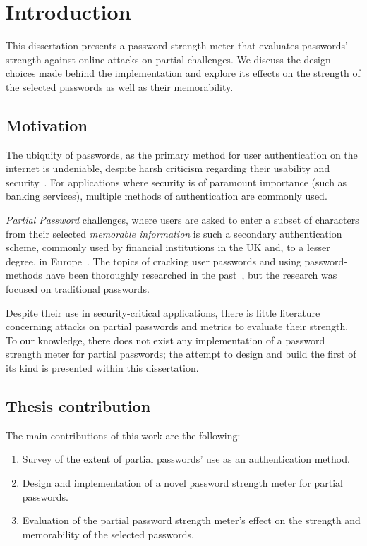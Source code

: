 
\chapter{Introduction}
  \label{cha:intro}
  This dissertation presents a password strength meter that evaluates passwords' strength against online attacks on partial challenges. We discuss the design choices made behind the implementation and explore its effects on the strength of the selected passwords as well as their memorability.

  \section{Motivation}
    \label{sec:motivation}
    The ubiquity of passwords, as the primary method for user authentication on the internet is undeniable, despite harsh criticism regarding their usability and security~\cite{replace_pass}. For applications where security is of paramount importance (such as banking services), multiple methods of authentication are commonly used.

    \emph{Partial Password} challenges, where users are asked to enter a subset of characters from their selected \emph{memorable information} is such a secondary authentication scheme, commonly used by financial institutions in the UK and, to a lesser degree, in Europe~\cite{2fa_uk}. The topics of cracking user passwords and using password-methods have been thoroughly researched in the past~\cite{pass_strength_empirical,pass_strength}, but the research was focused on traditional passwords.

    Despite their use in security-critical applications, there is little literature concerning attacks on partial passwords and metrics to evaluate their strength. To our knowledge, there does not exist any implementation of a password strength meter for partial passwords; the attempt to design and build the first of its kind is presented within this dissertation.

  \section{Thesis contribution}
    \label{sec:contribution}
    The main contributions of this work are the following:
    \begin{enumerate}
      \item Survey of the extent of partial passwords' use as an authentication method.
      \item Design and implementation of a novel password strength meter for partial passwords.
      \item Evaluation of the partial password strength meter's effect on the strength and memorability of the selected passwords.
    \end{enumerate}


